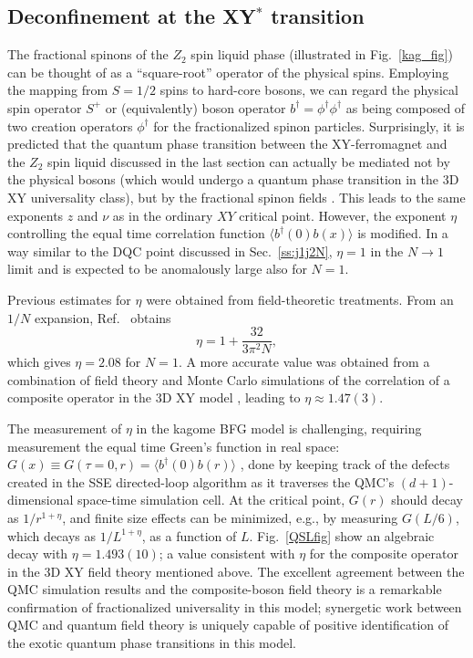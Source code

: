 \documentclass[10pt,pre,aps,twocolumn,showpacs,subscriptaddresses,floatfix]{revtex4}
\begin{document}
\subsection{Deconfinement at the XY$^*$ transition} \label{XYstar}

The fractional spinons of the $Z_2$ spin liquid phase (illustrated in Fig.~\ref{kag_fig}) can be thought of as a ``square-root'' operator of the physical spins.  Employing the mapping from $S=1/2$ spins to hard-core bosons, we can regard the physical spin operator $S^+$ or (equivalently) boson operator $b^{\dagger}=\phi^\dagger\phi^\dagger$ as being composed of two creation
operators $\phi^\dagger$ for the fractionalized spinon particles.  Surprisingly, it is predicted that the quantum phase transition between the XY-ferromagnet 
and the $Z_2$ spin liquid discussed in the last section can actually be mediated not by the physical bosons (which would undergo a quantum phase transition in the 3D XY universality class), but by the fractional spinon fields \cite{XYstar1,XYstar2,earlyXYstar}.  This leads to the same exponents $z$ and $\nu$ as in the ordinary $XY$ critical point.  However, the exponent $\eta$ controlling the equal time correlation function $\langle b^\dagger(0) b(x) \rangle$ 
is modified. In a way similar to the DQC point discussed in Sec.~\ref{ss:j1j2N}, $\eta=1$ in the $N\to 1$ limit and is expected to be anomalously large also for $N=1$.

Previous estimates for $\eta$ were obtained from field-theoretic treatments. From an $1/N$ expansion, Ref.~\cite{XYstar2} obtains
\begin{equation}
\eta = 1 + \frac{32}{3 \pi^2 N},
\end{equation}
which gives $\eta = 2.08$ for $N=1$.
A more accurate value was obtained from a combination of field theory and Monte Carlo simulations of the correlation of a composite operator in the 3D XY 
model \cite{compositefieldtheory,compositeMC}, leading to $\eta\approx  1.47(3)$.

The measurement of $\eta$ in the kagome BFG model is challenging, requiring measurement the equal time Green's function in real space: 
$G(x)\equiv G(\tau=0,r) = \langle b^\dagger(0) b(r) \rangle$ \cite{WormA,gfsse}, done by keeping track of the defects created in the SSE directed-loop algorithm \cite{Syljuasen02} 
as it traverses the QMC's $(d+1)$-dimensional space-time simulation cell.  At the critical point, $G(r)$ should decay as $1/r^{1+\eta}$, and finite size effects can be minimized, e.g., by measuring $G(L/6)$, which decays as $1/L^{1+\eta}$, as a function of $L$.  Fig.~\ref{QSLfig} show an algebraic decay with $\eta=1.493(10)$; a value consistent with $\eta$ for the composite operator in the 3D XY field theory mentioned above.  The excellent agreement between the QMC simulation results and the composite-boson field theory is a remarkable confirmation of fractionalized universality in this model; synergetic work between QMC and quantum field theory is uniquely capable of positive identification of the exotic quantum phase transitions in this model.
\end{document}

